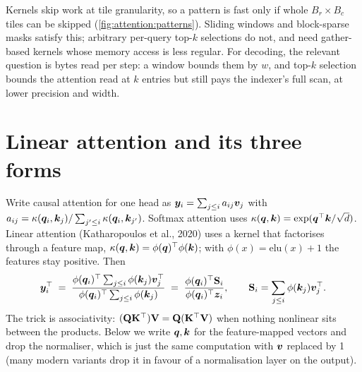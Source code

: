 \begin{systemslens}
Kernels skip work at tile granularity, so a pattern is fast only if whole $B_r\times B_c$ tiles can be
skipped (\cref{fig:attention:patterns}). Sliding windows and block-sparse masks satisfy this; arbitrary
per-query top-$k$ selections do not, and need gather-based kernels whose memory access is less regular.
For decoding, the relevant question is bytes read per step: a window bounds them by $w$, and top-$k$
selection bounds the attention read at $k$ entries but still pays the indexer's full scan, at lower
precision and width.
\end{systemslens}

\section{Linear attention and its three forms}\label{sec:attnalt:linear}

Write causal attention for one head as $\bm{y}_i=\sum_{j\le i} a_{ij}\bm{v}_j$ with
$a_{ij}=\kappa(\bm{q}_i,\bm{k}_j)/\sum_{j'\le i}\kappa(\bm{q}_i,\bm{k}_{j'})$. Softmax attention
uses $\kappa(\bm{q},\bm{k})=\exp(\bm{q}^\top\bm{k}/\sqrt d)$. Linear attention (Katharopoulos et
al., 2020) uses a kernel that factorises through a feature map, $\kappa(\bm{q},\bm{k})=
\phi(\bm{q})^\top\phi(\bm{k})$; with $\phi(x)=\mathrm{elu}(x)+1$ the features stay positive. Then
\begin{equation}
\bm{y}_i^\top \;=\; \frac{\phi(\bm{q}_i)^\top\sum_{j\le i}\phi(\bm{k}_j)\bm{v}_j^\top}
{\phi(\bm{q}_i)^\top\sum_{j\le i}\phi(\bm{k}_j)}
\;=\;\frac{\phi(\bm{q}_i)^\top\mathbf{S}_i}{\phi(\bm{q}_i)^\top\bm{z}_i},
\qquad \mathbf{S}_i=\sum_{j\le i}\phi(\bm{k}_j)\bm{v}_j^\top .
\label{eq:attnalt:linear}
\end{equation}
The trick is associativity: $(\mathbf{Q}\mathbf{K}^\top)\mathbf{V}=\mathbf{Q}(\mathbf{K}^\top\mathbf{V})$ when nothing
nonlinear sits between the products. Below we write $\bm{q},\bm{k}$ for the feature-mapped vectors and
drop the normaliser, which is just the same computation with $\bm{v}$ replaced by 1 (many modern
variants drop it in favour of a normalisation layer on the output).

